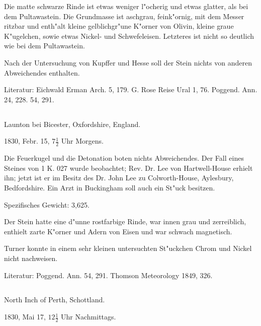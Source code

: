 \documentclass[a4paper, 11pt, oneside]{article}
\begin{document}
Die matte schwarze Rinde ist etwas weniger l"ocherig und etwas glatter, als bei dem Pultawastein. Die Grundmasse ist aschgrau, feink"ornig, mit dem Messer ritzbar und enth"alt kleine gelblichgr"une K"orner von Olivin, kleine graue K"ugelchen, sowie etwas Nickel- und Schwefeleisen. Letzteres ist nicht so deutlich wie bei dem Pultawastein.

Nach der Untersuchung von Kupffer und Hesse soll der Stein nichts von anderen Abweichendes enthalten.

\normalsize
Literatur: Eichwald Erman Arch. 5, 179. G. Rose Reise Ural 1, 76. Poggend. Ann. 24, 228. 54, 291.

\subsection{}
\LARGE
\paragraph{}
Launton bei Bicester, Oxfordshire, England.

1830, Febr. 15, $\mathfrak{7\frac{1}{2}}$ Uhr Morgens.

Die Feuerkugel und die Detonation boten nichts Abweichendes. Der Fall eines Steines von 1 K. 027 wurde beobachtet; Rev. Dr. Lee von Hartwell-House erhielt ihn; jetzt ist er im Besitz des Dr. John Lee zu Colworth-House, Aylesbury, Bedfordshire. Ein Arzt in Buckingham soll auch ein St"uck besitzen.

Spezifisches Gewicht: 3,625.

Der Stein hatte eine d"unne rostfarbige Rinde, war innen grau und zerreiblich, enthielt zarte K"orner und Adern von Eisen und war schwach magnetisch.

Turner konnte in einem sehr kleinen untersuchten St"uckchen Chrom und Nickel nicht nachweisen.

\normalsize
Literatur: Poggend. Ann. 54, 291. Thomson Meteorology 1849, 326.

\subsection{}
\LARGE
\paragraph{}
North Inch of Perth, Schottland.

1830, Mai 17, $\mathfrak{12\frac{1}{2}}$ Uhr Nachmittags.
\end{document}

